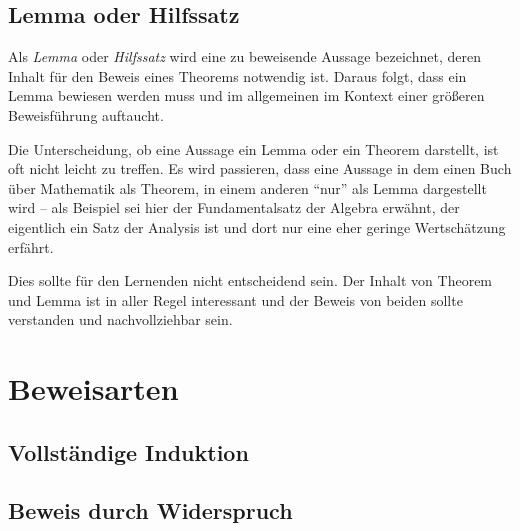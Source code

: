 \subsection{Lemma oder Hilfssatz}

Als \textsl{Lemma} oder \textsl{Hilfssatz} wird eine zu beweisende Aussage bezeichnet, deren Inhalt für den Beweis eines Theorems notwendig ist. Daraus folgt, dass ein Lemma bewiesen werden muss und im allgemeinen im Kontext einer größeren Beweisführung auftaucht. 

Die Unterscheidung, ob eine Aussage ein Lemma oder ein Theorem darstellt, ist oft nicht leicht zu treffen. Es wird passieren, dass eine Aussage in dem einen Buch über Mathematik als Theorem, in einem anderen "`nur"' als Lemma dargestellt wird -- als Beispiel sei hier der Fundamentalsatz der Algebra erwähnt, der eigentlich ein Satz der Analysis ist und dort nur eine eher geringe Wertschätzung erfährt. 

Dies sollte für den Lernenden nicht entscheidend sein. Der Inhalt von Theorem und Lemma ist in aller Regel interessant und der Beweis von beiden sollte verstanden und nachvollziehbar sein. 

\section{Beweisarten}

\subsection{Vollständige Induktion}

\subsection{Beweis durch Widerspruch}



